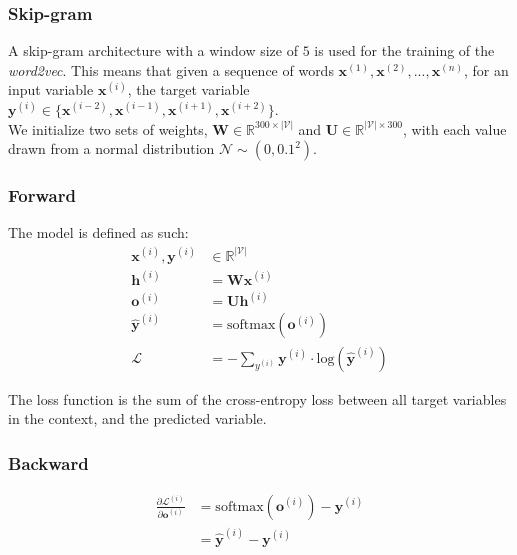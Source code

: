 \documentclass{article}
\numberwithin{equation}{section}
\begin{document}
\subsubsection{Skip-gram}
A skip-gram architecture with a window size of $5$ is used for the training of the \emph{word2vec}. This means that given a sequence of words $\bm{x}^{(1)}, \bm{x}^{(2)}, ..., \bm{x}^{(n)}$, for an input variable $\bm{x}^{(i)}$, the target variable $\bm{y}^{(i)} \in \{\bm{x}^{(i-2)}, \bm{x}^{(i-1)}, \bm{x}^{(i+1)}, \bm{x}^{(i+2)}\}$.\\

We initialize two sets of weights, $\bm{W} \in \mathbb{R}^{300 \times |\mathcal{V}|}$ and $\bm{U} \in \mathbb{R}^{|\mathcal{V}| \times 300}$, with each value drawn from a normal distribution $\mathcal{N} \sim (0, 0.1^2)$.\\

\subsubsection{Forward}
The model is defined as such:
\begin{equation}
\begin{split}
	\bm{x}^{(i)}, \bm{y}^{(i)} &\in \mathbb{R}^{|\mathcal{V}|} \\
	\bm{h}^{(i)} &= \bm{W} \bm{x}^{(i)} \\
	\bm{o}^{(i)} &= \bm{U} \bm{h}^{(i)} \\
 	\hat{\bm{y}}^{(i)} &= \text{softmax}(\bm{o}^{(i)}) \\
	\mathcal{L} &= -\sum_{y^{(i)}} \bm{y}^{(i)} \cdot \text{log}(\hat{\bm{y}}^{(i)})
\end{split}
\end{equation}

The loss function is the sum of the cross-entropy loss between all target variables in the context, and the predicted variable.

\subsubsection{Backward}
\begin{equation}
\begin{split}
\frac{\partial \mathcal{L}^{(i)}}{\partial \bm{o}^{(i)}}
	&= \text{softmax}(\bm{o}^{(i)}) - \bm{y}^{(i)} \\
	&= \hat{\bm{y}}^{(i)} - \bm{y}^{(i)}
\end{split}
\end{equation}
\end{document}
